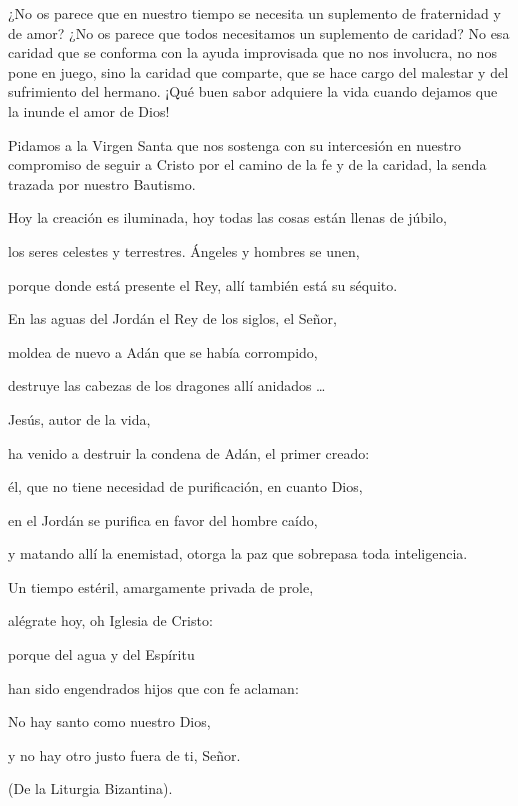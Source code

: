 \begin{body}
				¿No os parece que en nuestro tiempo se necesita un suplemento de fraternidad y de amor? ¿No os parece que todos necesitamos un suplemento de caridad? No esa caridad que se conforma con la ayuda improvisada que no nos involucra, no nos pone en juego, sino la caridad que comparte, que se hace cargo del malestar y del sufrimiento del hermano. ¡Qué buen sabor adquiere la vida cuando dejamos que la inunde el amor de Dios!
				
				Pidamos a la Virgen Santa que nos sostenga con su intercesión en nuestro compromiso de seguir a Cristo por el camino de la fe y de la caridad, la senda trazada por nuestro Bautismo.
			\end{body}
			
			\begin{patercite}
				Hoy la creación es iluminada, hoy todas las cosas están llenas de júbilo,
				
				los seres celestes y terrestres. Ángeles y hombres se unen,
				
				porque donde está presente el Rey, allí también está su séquito.
				
				En las aguas del Jordán el Rey de los siglos, el Señor,
				
				moldea de nuevo a Adán que se había corrompido,
				
				destruye las cabezas de los dragones allí anidados \ldots{}
				
				Jesús, autor de la vida,
				
				ha venido a destruir la condena de Adán, el primer creado:
				
				él, que no tiene necesidad de purificación, en cuanto Dios,
				
				en el Jordán se purifica en favor del hombre caído,
				
				y matando allí la enemistad, otorga la paz que sobrepasa toda inteligencia.
				
				Un tiempo estéril, amargamente privada de prole,
				
				alégrate hoy, oh Iglesia de Cristo:
				
				porque del agua y del Espíritu
				
				han sido engendrados hijos que con fe aclaman:
				
				No hay santo como nuestro Dios,
				
				y no hay otro justo fuera de ti, Señor.
				
				(De la Liturgia Bizantina).
			\end{patercite}
		
